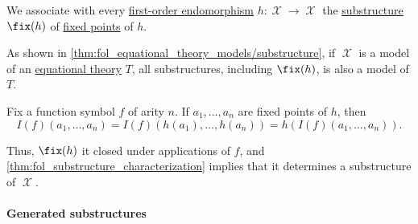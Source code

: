 \begin{definition}\label{def:fol_fixed_point_substructure}\mimprovised
  We associate with every \hyperref[def:fol_homomorphism]{first-order endomorphism} \( h: \mscrX \to \mscrX \) the \hyperref[def:fol_substructure]{substructure} \( \fix(h) \) of \hyperref[def:function_fixed_point]{fixed points} of \( h \).
\end{definition}
\begin{comments}
  \item As shown in \cref{thm:fol_equational_theory_models/substructure}, if \( \mscrX \) is a model of an \hyperref[def:fol_equational_theory]{equational theory} \( T \), all substructures, including \( \fix(h) \), is also a model of \( T \).
\end{comments}
\begin{defproof}
  Fix a function symbol \( f \) of arity \( n \). If \( a_1, \ldots, a_n \) are fixed points of \( h \), then
  \begin{equation*}
    I(f)(a_1, \ldots, a_n)
    =
    I(f)(h(a_1), \ldots, h(a_n))
    =
    h(I(f)(a_1, \ldots, a_n)).
  \end{equation*}

  Thus, \( \fix(h) \) it closed under applications of \( f \), and \cref{thm:fol_substructure_characterization} implies that it determines a substructure of \( \mscrX \).
\end{defproof}

\paragraph{Generated substructures}

